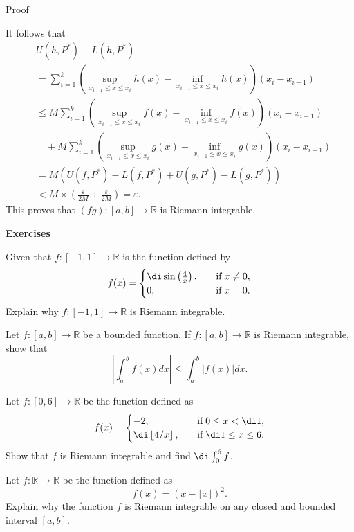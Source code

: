 \begin{myproof}{Proof}
 
\bp
 It follows that
\begin{align*}
&U(h,P^*)-L(h,P^*)\\&=\sum_{i=1}^k\left(\sup_{x_{i-1}\leq x\leq x_i}h(x)-\inf_{x_{i-1}\leq x\leq x_i}h(x)\right)(x_i-x_{i-1})\\
&\leq M\sum_{i=1}^k\left(\sup_{x_{i-1}\leq x\leq x_i}f(x)-\inf_{x_{i-1}\leq x\leq x_i}f(x)\right)(x_i-x_{i-1})\\
&\quad +M\sum_{i=1}^k\left(\sup_{x_{i-1}\leq x\leq x_i}g(x)-\inf_{x_{i-1}\leq x\leq x_i}g(x)\right)(x_i-x_{i-1})\\
&=M\left(U(f,P^*)-L(f,P^*)+U(g,P^*)-L(g,P^*)\right)\\
&<M\times\left(\frac{\varepsilon}{2M}+\frac{\varepsilon}{2M}\right)=\varepsilon.
\end{align*}This proves that $(fg):[a,b]\to\mathbb{R}$ is   Riemann integrable.
\end{myproof}
\vp
\noindent
{\bf \large Exercises  \thesection}
\setcounter{myquestion}{1}
 
\begin{question}{\themyquestion}
Given that $f:[-1,1]\to\mathbb{R}$ is the function defined by
\[f(x)=\begin{cases} \di \sin\left(\frac{4}{x}\right),\quad &\text{if}\;x\neq 0,\\
0,\quad &\text{if}\;x= 0.\end{cases}\]Explain why $f:[-1,1]\to\mathbb{R}$ is Riemann integrable.
\end{question}
\atc

\begin{question}{\themyquestion}
Let $f:[a,b]\to\mathbb{R}$ be a bounded function. If $f:[a,b]\to\mathbb{R}$ is Riemann integrable, show that
\[\left|\int_a^b f(x)dx\right|\leq \int_a^b |f(x)|dx.\]
\end{question}
\atc
\begin{question}{\themyquestion}
Let $f:[0,6]\to\mathbb{R}$ be the function defined as 
\begin{align*}
f(x)=\begin{cases} -2,\quad &\text{if}\;0\leq x<\di 1,\\
\di\left\lfloor 4/x\right\rfloor,\quad &\text{if}\; \di 1\leq x\leq 6.\end{cases}
\end{align*}Show that $f$ is Riemann integrable and find $\di\int_0^6 f$. 
\end{question}
\atc



\begin{question}{\themyquestion}
Let $f:\mathbb{R}\to\mathbb{R}$ be the function defined as
\[f(x)=\left(x-\lfloor x\rfloor\right)^2.\]
Explain why the function $f$ is Riemann integrable on any closed and bounded interval $[a,b]$.
\end{question}

